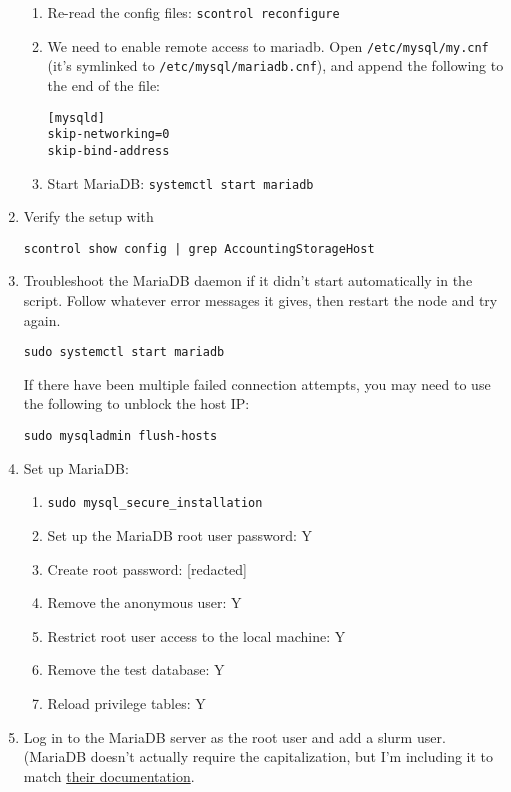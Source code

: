 \begin{enumerate}
\begin{enumerate}
	\item Re-read the config files: \texttt{scontrol reconfigure}

	\item We need to enable remote access to mariadb. Open \texttt{/etc/mysql/my.cnf} (it's symlinked to \texttt{/etc/mysql/mariadb.cnf}), and append the following to the end of the file:

		\texttt{[mysqld]} \\
		\texttt{skip-networking=0} \\
		\texttt{skip-bind-address}

	\item Start MariaDB: \texttt{systemctl start mariadb}
	\end{enumerate}


\item Verify the setup with

	\texttt{scontrol show config | grep AccountingStorageHost}

\item Troubleshoot the MariaDB daemon if it didn't start automatically in the script. Follow whatever error messages it gives, then restart the node and try again.

	\texttt{sudo systemctl start mariadb}

If there have been multiple failed connection attempts, you may need to use the following to unblock the host IP: 

	\texttt{sudo mysqladmin flush-hosts}

\item Set up MariaDB:

	\begin{enumerate}
	\item \texttt{sudo mysql\_secure\_installation}
	\item Set up the MariaDB root user password: Y 
	\item Create root password: [redacted]
	\item Remove the anonymous user: Y
	\item Restrict root user access to the local machine: Y
	\item Remove the test database: Y
	\item Reload privilege tables: Y
	\end{enumerate}

\item Log in to the MariaDB server as the root user and add a slurm user. (MariaDB doesn't actually require the capitalization, but I'm including it to match \href{https://mariadb.com/kb/en/library/account-management-sql-commands/}{their documentation}.


\end{enumerate}
